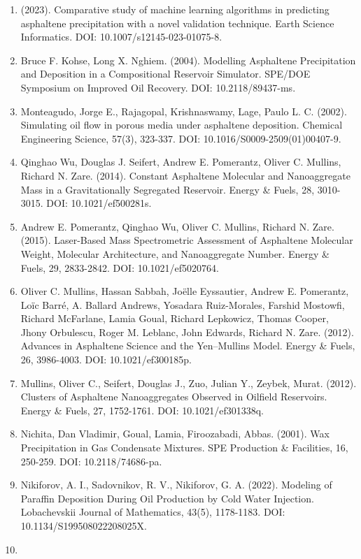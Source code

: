 \documentclass[11pt]{extarticle}
\begin{document}
\begin{enumerate}
\item
  (2023). Comparative study of machine learning algorithms in predicting asphaltene precipitation with a novel validation technique. Earth Science Informatics. DOI: 10.1007/s12145-023-01075-8.
\item
  Bruce F. Kohse, Long X. Nghiem. (2004). Modelling Asphaltene Precipitation and Deposition in a Compositional Reservoir Simulator. SPE/DOE Symposium on Improved Oil Recovery. DOI: 10.2118/89437-ms.
\item
  Monteagudo, Jorge E., Rajagopal, Krishnaswamy, Lage, Paulo L. C. (2002). Simulating oil flow in porous media under asphaltene deposition. Chemical Engineering Science, 57(3), 323-337. DOI: 10.1016/S0009-2509(01)00407-9.
\item
  Qinghao Wu, Douglas J. Seifert, Andrew E. Pomerantz, Oliver C. Mullins, Richard N. Zare. (2014). Constant Asphaltene Molecular and Nanoaggregate Mass in a Gravitationally Segregated Reservoir. Energy \& Fuels, 28, 3010-3015. DOI: 10.1021/ef500281s.
\item
  Andrew E. Pomerantz, Qinghao Wu, Oliver C. Mullins, Richard N. Zare. (2015). Laser-Based Mass Spectrometric Assessment of Asphaltene Molecular Weight, Molecular Architecture, and Nanoaggregate Number. Energy \& Fuels, 29, 2833-2842. DOI: 10.1021/ef5020764.
\item
  Oliver C. Mullins, Hassan Sabbah, Joëlle Eyssautier, Andrew E. Pomerantz, Loïc Barré, A. Ballard Andrews, Yosadara Ruiz-Morales, Farshid Mostowfi, Richard McFarlane, Lamia Goual, Richard Lepkowicz, Thomas Cooper, Jhony Orbulescu, Roger M. Leblanc, John Edwards, Richard N. Zare. (2012). Advances in Asphaltene Science and the Yen--Mullins Model. Energy \& Fuels, 26, 3986-4003. DOI: 10.1021/ef300185p.
\item
  Mullins, Oliver C., Seifert, Douglas J., Zuo, Julian Y., Zeybek, Murat. (2012). Clusters of Asphaltene Nanoaggregates Observed in Oilfield Reservoirs. Energy \& Fuels, 27, 1752-1761. DOI: 10.1021/ef301338q.
\item
  Nichita, Dan Vladimir, Goual, Lamia, Firoozabadi, Abbas. (2001). Wax Precipitation in Gas Condensate Mixtures. SPE Production \& Facilities, 16, 250-259. DOI: 10.2118/74686-pa.
\item
  Nikiforov, A. I., Sadovnikov, R. V., Nikiforov, G. A. (2022). Modeling of Paraffin Deposition During Oil Production by Cold Water Injection. Lobachevskii Journal of Mathematics, 43(5), 1178-1183. DOI: 10.1134/S199508022208025X.
\item

\end{enumerate}
\end{document}
